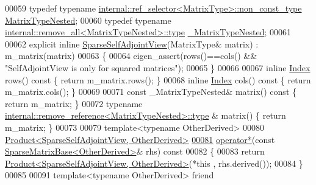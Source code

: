 \begin{DoxyCode}
00059     \textcolor{keyword}{typedef} \textcolor{keyword}{typename} \hyperlink{class_eigen_1_1internal_1_1_tensor_lazy_evaluator_writable}{internal::ref\_selector<MatrixType>::non\_const\_type}
       \hyperlink{class_eigen_1_1internal_1_1_tensor_lazy_evaluator_writable}{MatrixTypeNested};
00060     \textcolor{keyword}{typedef} \textcolor{keyword}{typename} \hyperlink{group___sparse_core___module}{internal::remove\_all<MatrixTypeNested>::type}
       \hyperlink{group___sparse_core___module}{\_MatrixTypeNested};
00061     
00062     \textcolor{keyword}{explicit} \textcolor{keyword}{inline} \hyperlink{group___sparse_core___module_class_eigen_1_1_sparse_self_adjoint_view}{SparseSelfAdjointView}(MatrixType& matrix) : m\_matrix(matrix)
00063     \{
00064       eigen\_assert(rows()==cols() && \textcolor{stringliteral}{"SelfAdjointView is only for squared matrices"});
00065     \}
00066 
00067     \textcolor{keyword}{inline} \hyperlink{group___core___module_a554f30542cc2316add4b1ea0a492ff02}{Index} rows()\textcolor{keyword}{ const }\{ \textcolor{keywordflow}{return} m\_matrix.rows(); \}
00068     \textcolor{keyword}{inline} \hyperlink{group___core___module_a554f30542cc2316add4b1ea0a492ff02}{Index} cols()\textcolor{keyword}{ const }\{ \textcolor{keywordflow}{return} m\_matrix.cols(); \}
00069 
00071     \textcolor{keyword}{const} \_MatrixTypeNested& matrix()\textcolor{keyword}{ const }\{ \textcolor{keywordflow}{return} m\_matrix; \}
00072     \textcolor{keyword}{typename} \hyperlink{group___sparse_core___module}{internal::remove\_reference<MatrixTypeNested>::type}
      & matrix() \{ \textcolor{keywordflow}{return} m\_matrix; \}
00073 
00079     \textcolor{keyword}{template}<\textcolor{keyword}{typename} OtherDerived>
00080     \hyperlink{group___core___module_class_eigen_1_1_product}{Product<SparseSelfAdjointView, OtherDerived>}
\hyperlink{group___sparse_core___module_a9d1e5ef26775e3b43be08fd4ae191aa8}{00081}     \hyperlink{group___sparse_core___module_a9d1e5ef26775e3b43be08fd4ae191aa8}{operator*}(\textcolor{keyword}{const} \hyperlink{group___sparse_core___module_class_eigen_1_1_sparse_matrix_base}{SparseMatrixBase<OtherDerived>}& rhs)\textcolor{keyword}{ const}
00082 \textcolor{keyword}{    }\{
00083       \textcolor{keywordflow}{return} \hyperlink{group___core___module_class_eigen_1_1_product}{Product<SparseSelfAdjointView, OtherDerived>}(*\textcolor{keyword}{this}
      , rhs.derived());
00084     \}
00085 
00091     \textcolor{keyword}{template}<\textcolor{keyword}{typename} OtherDerived> \textcolor{keyword}{friend}

\end{DoxyCode}
